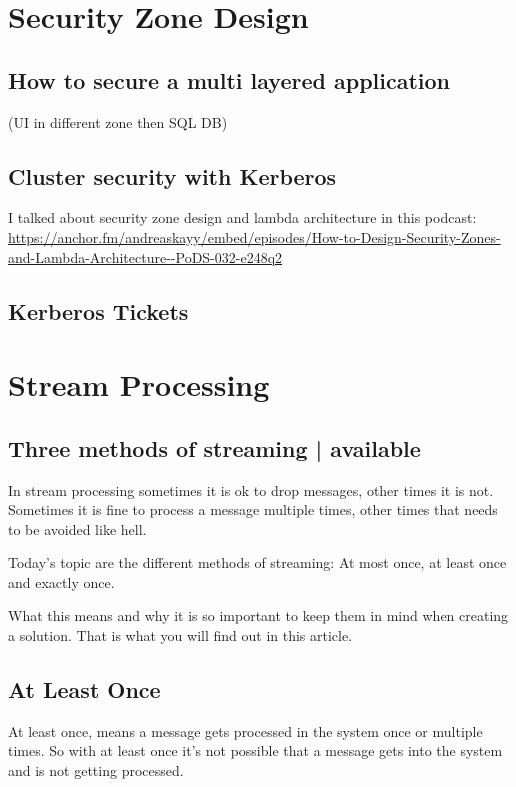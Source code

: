 \documentclass[12pt, numbers=noenddot]{scrreprt} %
\begin{document}
\chapter{Security Zone Design}
\section{How to secure a multi layered application}
(UI in different zone then SQL DB)

\section{Cluster security with Kerberos}

I talked about security zone design and lambda architecture in this podcast: \url{https://anchor.fm/andreaskayy/embed/episodes/How-to-Design-Security-Zones-and-Lambda-Architecture--PoDS-032-e248q2}

\section{Kerberos Tickets}

\chapter{Stream Processing}
\section{Three methods of streaming | available}

In stream processing sometimes it is ok to drop messages, other times it is not. Sometimes it is fine to process a message multiple times, other times that needs to be avoided like hell.

Today’s topic are the different methods of streaming: At most once, at least once and exactly once.

What this means and why it is so important to keep them in mind when creating a solution. That is what you will find out in this article.

\section{At Least Once}

At least once, means a message gets processed in the system once or multiple times. So with at least once it’s not possible that a message gets into the system and is not getting processed.
\end{document}
